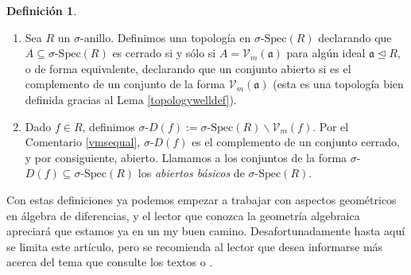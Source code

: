 \documentclass[letterpaper]{article}
\def\sSpec{\sigma\text{-Spec}}
\def\Vm{\mathcal{V}_m}
\def\a{\mathfrak{a}}
\def\s{\sigma}
\theoremstyle{definition}
\newtheorem{defn}[Satz]{Definici\'on}
\begin{document}
\begin{defn} $\phantom{}$

\begin{enumerate}
\item Sea $R$ un $\sigma$-anillo. Definimos una topolog\'ia en $\sSpec(R)$ declarando que $A \subseteq \sSpec(R)$ es cerrado si y s\'olo si $A = \Vm(\a)$ para alg\'un ideal $\a \unlhd R$, o de forma equivalente,
 declarando que un conjunto abierto si es el complemento de un conjunto de la forma $\Vm(\a)$ (esta es una topolog\'ia bien definida gracias al Lema \ref{topologywelldef}).
\item Dado $f \in R$, definimos $\sigma$-$D(f):= \sSpec(R) \backslash \Vm(f)$. Por el Comentario \ref{vmsequal}, $\s$-$D(f)$ es el complemento de un conjunto cerrado, y por consiguiente, abierto.
Llamamos a los conjuntos de la forma $\s$-$D(f) \subseteq \sSpec(R)$ los \emph{abiertos b\'asicos} de $\sSpec(R)$.
\end{enumerate}
\end{defn}

Con estas definiciones ya podemos empezar a trabajar con aspectos geom\'etricos en \'algebra de diferencias, y el lector que conozca la geometr\'ia algebraica apreciar\'a que estamos ya en un my buen camino.
Desafortunadamente hasta aqu\'i se limita este art\'iculo, pero se recomienda al lector que desea informarse m\'as acerca del tema que consulte los textos \cite{cohn} o \cite{levin}.
\end{document}
